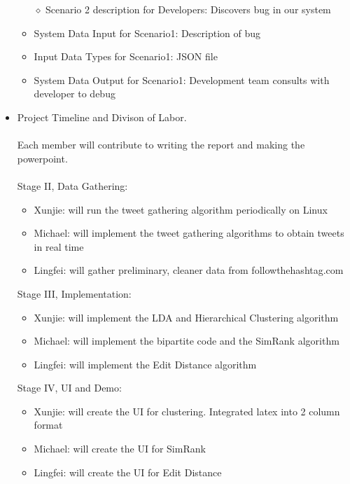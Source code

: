 \documentclass[10pt]{article}
\begin{document}
\begin{itemize}
	\begin{itemize} 
	\item[$\diamond$]{Scenario 2 description for Developers: }
	Discovers bug in our system
	\item{System Data Input for Scenario1: }
	Description of bug
	\item{Input Data Types for Scenario1: }
	JSON file
	\item{System Data Output for Scenario1: }
	Development team consults with developer to debug
	\end{itemize}
\item{Project Timeline and Divison of Labor.}
\\\\ Each member will contribute to writing the report and making the powerpoint.
\\\\ Stage II, Data Gathering:
\begin{itemize} 
\item{Xunjie: will run the tweet gathering algorithm periodically on Linux}
\item{Michael: will implement the tweet gathering algorithms to obtain tweets in real time}
\item{Lingfei: will gather preliminary, cleaner data from followthehashtag.com}
\end{itemize}
Stage III, Implementation:
\begin{itemize} 
\item{Xunjie: will implement the LDA and Hierarchical Clustering algorithm}
\item{Michael: will implement the bipartite code and the SimRank algorithm}
\item{Lingfei: will implement the Edit Distance algorithm}
\end{itemize}
Stage IV, UI and Demo:
\begin{itemize} 
\item{Xunjie: will create the UI for clustering. Integrated latex into 2 column format}
\item{Michael: will create the UI for SimRank}
\item{Lingfei: will create the UI for Edit Distance}
\end{itemize}
\end{itemize}
\end{document}
